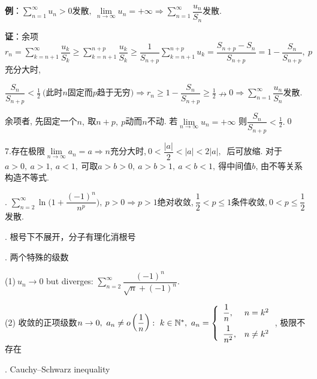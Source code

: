 \documentclass[UTF8]{ctexart}
\numberwithin{equation}{section}
\numberwithin{figure}{section}
\numberwithin{table}{section}
\newcommand\no{\noindent}
\newcommand\dis{\displaystyle}
\newcommand\ls{\leqslant}
\newcommand\gs{\geqslant}
\newcommand\limn{\dis\lim\limits_{n\to\infty}}
\newcommand\sumn{\dis\sum\limits_{n=1}^{\infty}}
\begin{document}
\begin{spacing}{2}
\textbf{例}：$\sumn u_n>0$发散$,\ \limn u_n=+\infty
\Longrightarrow\sumn \dfrac{u_n}{S_n}$发散.

\vspace{0.2cm}

\textbf{证}：余项$\dis r_n=\sum\limits_{k=n+1}^\infty\dfrac{u_k}{S_k}\gs
\sum\limits_{k=n+1}^{n+p}\dfrac{u_k}{S_k}\gs
\dfrac{1}{S_{n+p}}\sum\limits_{k=n+1}^{n+p}u_k
=\dfrac{S_{n+p}-S_n}{S_{n+p}}=1-\dfrac{S_n}{S_{n+p}},\ 
p$充分大时,

\vspace{0.2cm}

$\dis\dfrac{S_n}{S_{n+p}}<\frac{1}{2}\ \Big(\text{此时}n\text{固定而}p\text{趋于无穷}\Big)
\Longrightarrow
r_n\gs1-\dfrac{S_n}{S_{n+p}}\gs\frac{1}{2}\nrightarrow0
\Longrightarrow\sumn \dfrac{u_n}{S_n}$发散.

\vspace{0.2cm}

余项者, 先固定一个$n,\ $取$n+p,\ p$动而$n$不动. 若$\limn u_n=+\infty$
则$\dis\dfrac{S_n}{S_{n+p}}<\frac{1}{2}.$\qed

\vspace{0.2cm}

\no7.存在极限$\limn a_n=a\Longrightarrow n$充分大时,$\ 0<\dfrac{|a|}{2}<|a|<2|a|,\ $
后可放缩. 对于$a>0,\ a>1,\ a<1,\ $可取$a>b>0,\ a>b>1,\ a<b<1,\ $得中间值$b$, 由不等关系构造不等式.

\vspace{0.2cm}

\no8. $\dis\sum\limits_{n=2}^\infty\ln\Bigg(1+\dfrac{(-1)^n}{n^p}\Bigg),\ p>0
\Longrightarrow p>1$绝对收敛,$\ \dfrac{1}{2}<p\ls1$条件收敛,$\ 0<p\ls\dfrac{1}{2}$发散.

\vspace{0.2cm}

\no9. 根号下不展开，分子有理化消根号

\no10. 两个特殊的级数

(1)$\ u_n\to0$ but diverges: 
$\dis\sum\limits_{n=2}^\infty\dfrac{(-1)^n}{\sqrt{n}+(-1)^n}.$

(2) 收敛的正项级数$n\to0,\ a_n\neq o\left(\dfrac{1}{n}\right):\ k\in\mathbb{N}^*,\ 
a_n=\left\{\begin{array}{ll}
\dfrac{1}{n},&n=k^2\vspace{0.2cm}\\
\dfrac{1}{n^2},&n\neq k^2\\
\end{array}\right.$, 极限不存在

\no11. \textcolor[rgb]{1,0,0}{Cauchy–Schwarz inequality}


\end{spacing}
\end{document}
